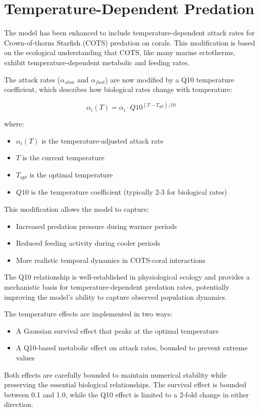 \section{Temperature-Dependent Predation}

The model has been enhanced to include temperature-dependent attack rates for Crown-of-thorns Starfish (COTS) predation on corals. This modification is based on the ecological understanding that COTS, like many marine ectotherms, exhibit temperature-dependent metabolic and feeding rates.

The attack rates ($\alpha_{slow}$ and $\alpha_{fast}$) are now modified by a Q10 temperature coefficient, which describes how biological rates change with temperature:

\[ \alpha_{i}(T) = \alpha_{i} \cdot Q10^{(T-T_{opt})/10} \]

where:
\begin{itemize}
    \item $\alpha_{i}(T)$ is the temperature-adjusted attack rate
    \item $T$ is the current temperature
    \item $T_{opt}$ is the optimal temperature
    \item $Q10$ is the temperature coefficient (typically 2-3 for biological rates)
\end{itemize}

This modification allows the model to capture:
\begin{itemize}
    \item Increased predation pressure during warmer periods
    \item Reduced feeding activity during cooler periods
    \item More realistic temporal dynamics in COTS-coral interactions
\end{itemize}

The Q10 relationship is well-established in physiological ecology and provides a mechanistic basis for temperature-dependent predation rates, potentially improving the model's ability to capture observed population dynamics.

The temperature effects are implemented in two ways:
\begin{itemize}
    \item A Gaussian survival effect that peaks at the optimal temperature
    \item A Q10-based metabolic effect on attack rates, bounded to prevent extreme values
\end{itemize}

Both effects are carefully bounded to maintain numerical stability while preserving the essential biological relationships. The survival effect is bounded between 0.1 and 1.0, while the Q10 effect is limited to a 2-fold change in either direction.
